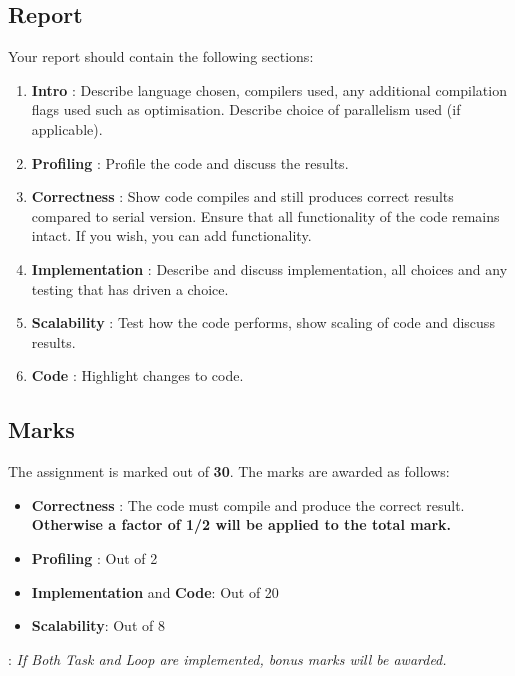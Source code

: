 \documentclass[11pt]{amsart}
\begin{document}
\subsection*{Report\nopunct\\}\label{sec:handin:report}
\noindent Your report should contain the following sections:
  \begin{enumerate}
  \item{\textbf{Intro} : Describe language chosen, compilers used, any additional compilation flags used such as optimisation. Describe choice of parallelism used (if applicable).} 
  \item{\textbf{Profiling} : Profile the code and discuss the results.}
  \item{\textbf{Correctness} : Show code compiles and still produces correct results compared to serial version. Ensure that all 
functionality of the code remains intact. If you wish, you can add functionality.}
  \item{\textbf{Implementation} : Describe and discuss implementation, all choices and any testing that has driven a choice.}
  \item{\textbf{Scalability} : Test how the code performs, show scaling of code and discuss results.}
  \item{\textbf{Code} : Highlight changes to code.}
\end{enumerate}

\subsection*{Marks\nopunct\\}\label{sec:handin:marks}
\noindent The assignment is marked out of \textbf{30}. The marks are awarded as follows:
\begin{itemize}
  \item{\textbf{Correctness} : The code must compile and produce the correct result. \textbf{Otherwise a factor of 1/2 will be applied to the total mark.}}
  \item{\textbf{Profiling} : Out of 2}
  \item{\textbf{Implementation} and \textbf{Code}: Out of 20}
  \item{\textbf{Scalability}: Out of 8}
\end{itemize}

: \textit{If Both Task and Loop are implemented, bonus marks will be awarded.}

\end{document}
